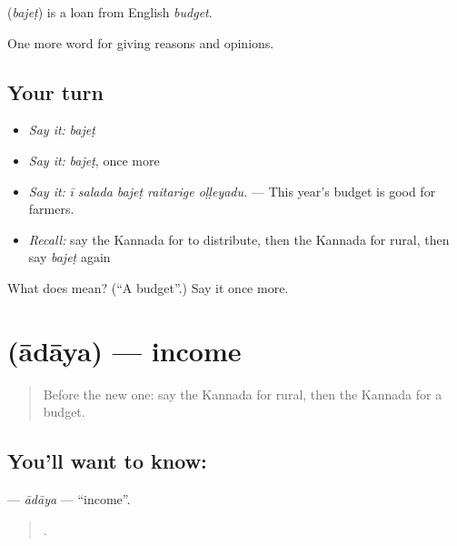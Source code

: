 \begin{cousinweb}
\textbf{} (\emph{bajeṭ}) is a loan from English \emph{budget}.
\end{cousinweb}

\begin{grammarlens}[title={What you've built}]
One more word for giving reasons and opinions.
\end{grammarlens}

\subsection*{Your turn}
\begin{itemize}
\raggedright
  \item \emph{Say it:} \emph{bajeṭ}
  \item \emph{Say it:} \emph{bajeṭ}, once more
  \item \emph{Say it:} \emph{ī salada bajeṭ raitarige oḷḷeyadu.} — This year's budget is good for farmers.
  \item \emph{Recall:} say the Kannada for to distribute, then the Kannada for rural, then say \emph{bajeṭ} again
\end{itemize}

\begin{tcolorbox}[breakable,colback=teal!4,colframe=teal!35!black,title={Before you move on}]
What does  mean? (\textquotedblleft{}A budget\textquotedblright{}.) Say it once more.
\end{tcolorbox}
\section[\texorpdfstring{\kn{ಆದಾಯ} (ādāya)}{ಆದಾಯ (ādāya)}]{ (ādāya) — income}

\label{lesson:KA-C400-adaya}



\begin{quote}
Before the new one: say the Kannada for rural, then the Kannada for a budget.
\end{quote}

\subsection*{You'll want to know: }
\textbf{} — \emph{ādāya} — \textquotedblleft{}income\textquotedblright{}.

\begin{quote}
   .
\end{quote}

